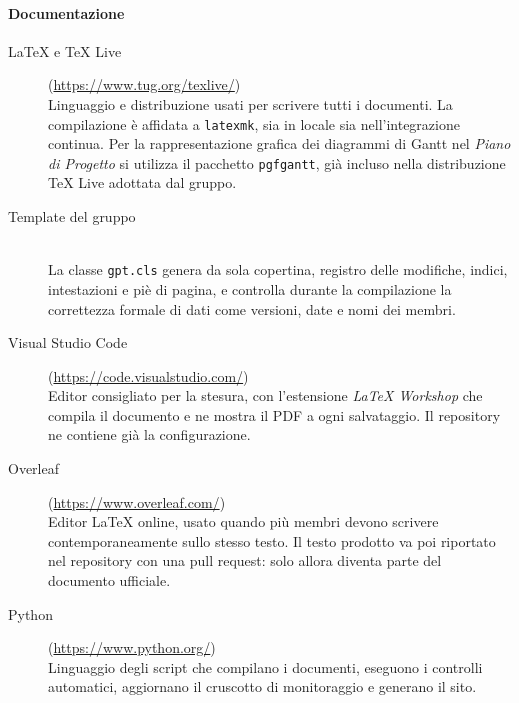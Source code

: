 \documentclass[documento]{gpt}
\begin{document}
	\paragraph{Documentazione}
	\begin{description}
		\item[\LaTeX{} e TeX Live] (\url{https://www.tug.org/texlive/}) \hfill \\
		Linguaggio e distribuzione usati per scrivere tutti i documenti. La
		compilazione è affidata a \texttt{latexmk}, sia in locale sia
		nell'integrazione continua. Per la rappresentazione grafica dei
		diagrammi di Gantt nel \textit{Piano di Progetto} si utilizza il
		pacchetto \texttt{pgfgantt}, già incluso nella distribuzione TeX Live
		adottata dal gruppo.
		\item[Template del gruppo] \hfill \\
		La classe \texttt{gpt.cls} genera da sola copertina, registro delle
		modifiche, indici, intestazioni e piè di pagina, e controlla durante
		la compilazione la correttezza formale di dati come versioni, date e
		nomi dei membri.
		\item[Visual Studio Code] (\url{https://code.visualstudio.com/}) \hfill \\
		Editor consigliato per la stesura, con l'estensione \textit{LaTeX
			Workshop} che compila il documento e ne mostra il PDF a ogni
		salvataggio. Il repository ne contiene già la configurazione.
		\item[Overleaf] (\url{https://www.overleaf.com/}) \hfill \\
		Editor \LaTeX{} online, usato quando più membri devono scrivere
		contemporaneamente sullo stesso testo. Il testo prodotto va poi
		riportato nel repository con una pull request: solo allora diventa
		parte del documento ufficiale.
		\item[Python] (\url{https://www.python.org/}) \hfill \\
		Linguaggio degli script che compilano i documenti, eseguono i
		controlli automatici, aggiornano il cruscotto di monitoraggio e
		generano il sito.
	\end{description}
	
\end{document}
